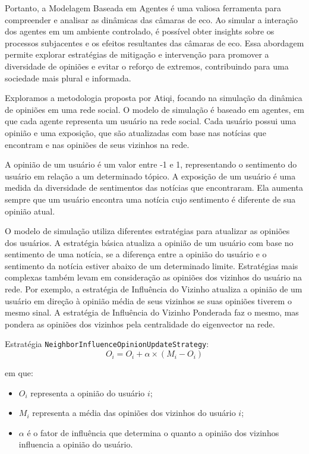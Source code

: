 Portanto, a Modelagem Baseada em Agentes é uma valiosa ferramenta para compreender e analisar as dinâmicas das câmaras de eco. Ao simular a interação dos agentes em um ambiente controlado, é possível obter insights sobre os processos subjacentes e os efeitos resultantes das câmaras de eco. Essa abordagem permite explorar estratégias de mitigação e intervenção para promover a diversidade de opiniões e evitar o reforço de extremos, contribuindo para uma sociedade mais plural e informada.

Exploramos a metodologia proposta por Atiqi, focando na simulação da dinâmica de opiniões em uma rede social. O modelo de simulação é baseado em agentes, em que cada agente representa um usuário na rede social. Cada usuário possui uma opinião e uma exposição, que são atualizadas com base nas notícias que encontram e nas opiniões de seus vizinhos na rede.

A opinião de um usuário é um valor entre -1 e 1, representando o sentimento do usuário em relação a um determinado tópico. A exposição de um usuário é uma medida da diversidade de sentimentos das notícias que encontraram. Ela aumenta sempre que um usuário encontra uma notícia cujo sentimento é diferente de sua opinião atual.

O modelo de simulação utiliza diferentes estratégias para atualizar as opiniões dos usuários. A estratégia básica atualiza a opinião de um usuário com base no sentimento de uma notícia, se a diferença entre a opinião do usuário e o sentimento da notícia estiver abaixo de um determinado limite. Estratégias mais complexas também levam em consideração as opiniões dos vizinhos do usuário na rede. Por exemplo, a estratégia de Influência do Vizinho atualiza a opinião de um usuário em direção à opinião média de seus vizinhos se suas opiniões tiverem o mesmo sinal. A estratégia de Influência do Vizinho Ponderada faz o mesmo, mas pondera as opiniões dos vizinhos pela centralidade do eigenvector na rede.

Estratégia \texttt{NeighborInfluenceOpinionUpdateStrategy}:
\begin{equation*}
	O_i = O_i + \alpha \times (M_i - O_i)
\end{equation*}

em que:

\begin{itemize}
	\item $O_i$ representa a opinião do usuário $i$;
	\item $M_i$ representa a média das opiniões dos vizinhos do usuário $i$;
	\item $\alpha$ é o fator de influência que determina o quanto a opinião dos vizinhos influencia a opinião do usuário.
\end{itemize}

